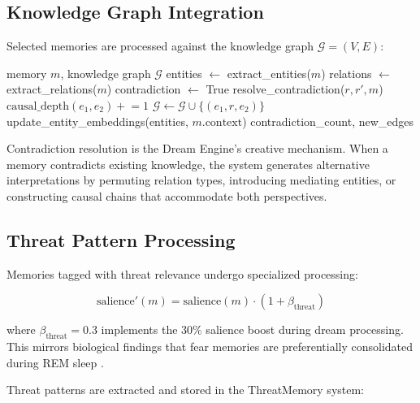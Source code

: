 \documentclass[11pt,a4paper]{article}
\begin{document}
\subsection{Knowledge Graph Integration}

Selected memories are processed against the knowledge graph $\mathcal{G} = (V, E)$:

\begin{algorithm}[h]
\caption{Dream Knowledge Integration}
\label{alg:knowledge}
\begin{algorithmic}[1]
\REQUIRE memory $m$, knowledge graph $\mathcal{G}$
\STATE entities $\leftarrow$ extract\_entities($m$)
\STATE relations $\leftarrow$ extract\_relations($m$)
        \STATE contradiction $\leftarrow$ True
        \STATE resolve\_contradiction($r, r', m$) 
        \STATE $\text{causal\_depth}(e_1, e_2) \mathrel{+}= 1$
    \ELSE
        \STATE $\mathcal{G} \leftarrow \mathcal{G} \cup \{(e_1, r, e_2)\}$
    \ENDIF
\ENDFOR
\STATE update\_entity\_embeddings(entities, $m.\text{context}$)
\RETURN contradiction\_count, new\_edges
\end{algorithmic}
\end{algorithm}

Contradiction resolution is the Dream Engine's creative mechanism. When a memory contradicts existing knowledge, the system generates alternative interpretations by permuting relation types, introducing mediating entities, or constructing causal chains that accommodate both perspectives.

\subsection{Threat Pattern Processing}

Memories tagged with threat relevance undergo specialized processing:

\begin{equation}
\text{salience}'(m) = \text{salience}(m) \cdot (1 + \beta_{\text{threat}})
\end{equation}

where $\beta_{\text{threat}} = 0.3$ implements the 30\% salience boost during dream processing. This mirrors biological findings that fear memories are preferentially consolidated during REM sleep \citep{pace-schott2015}.

Threat patterns are extracted and stored in the ThreatMemory system:
\end{document}
